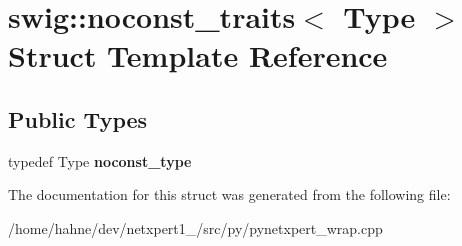 \hypertarget{structswig_1_1noconst__traits}{}\section{swig\+:\+:noconst\+\_\+traits$<$ Type $>$ Struct Template Reference}
\label{structswig_1_1noconst__traits}
\subsection*{Public Types}
\begin{DoxyCompactItemize}
\item 
typedef Type {\bfseries noconst\+\_\+type}\hypertarget{structswig_1_1noconst__traits_a372428d7bd7dc7ea86f03714159d6354}{}\label{structswig_1_1noconst__traits_a372428d7bd7dc7ea86f03714159d6354}

\end{DoxyCompactItemize}


The documentation for this struct was generated from the following file\+:\begin{DoxyCompactItemize}
\item 
/home/hahne/dev/netxpert1\+\_/src/py/pynetxpert\+\_\+wrap.\+cpp\end{DoxyCompactItemize}
